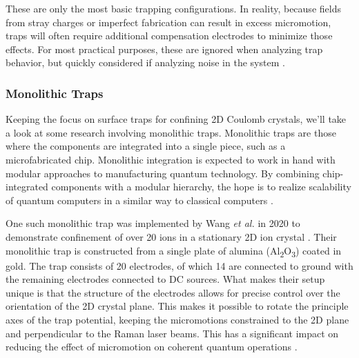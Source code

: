 These are only the most basic trapping configurations. In reality, because fields from stray charges or imperfect fabrication can result in excess micromotion, traps will often require additional compensation electrodes to minimize those effects. For most practical purposes, these are ignored when analyzing trap behavior, but quickly considered if analyzing noise in the system \cite{Brownnutt}.

\subsubsection{Monolithic Traps}
Keeping the focus on surface traps for confining 2D Coulomb crystals, we'll take a look at some research involving monolithic traps. Monolithic traps are those where the components are integrated into a single piece, such as a microfabricated chip. Monolithic integration is expected to work in hand with modular approaches to manufacturing quantum technology. By combining chip-integrated components with a modular hierarchy, the hope is to realize scalability of quantum computers in a similar way to classical computers \cite{Bruzewicz}.

One such monolithic trap was implemented by Wang \textit{et al.} in 2020 to demonstrate confinement of over 20  ions in a stationary 2D ion crystal \cite{YeWang}. Their monolithic trap is constructed from a single plate of alumina (Al\textsubscript{2}O\textsubscript{3}) coated in gold. The trap consists of 20 electrodes, of which 14 are connected to ground with the remaining electrodes connected to DC sources. What makes their setup unique is that the structure of the electrodes allows for precise control over the orientation of the 2D crystal plane. This makes it possible to rotate the principle axes of the trap potential, keeping the micromotions constrained to the 2D plane and perpendicular to the Raman laser beams. This has a significant impact on reducing the effect of micromotion on coherent quantum operations \cite{YeWang}.

